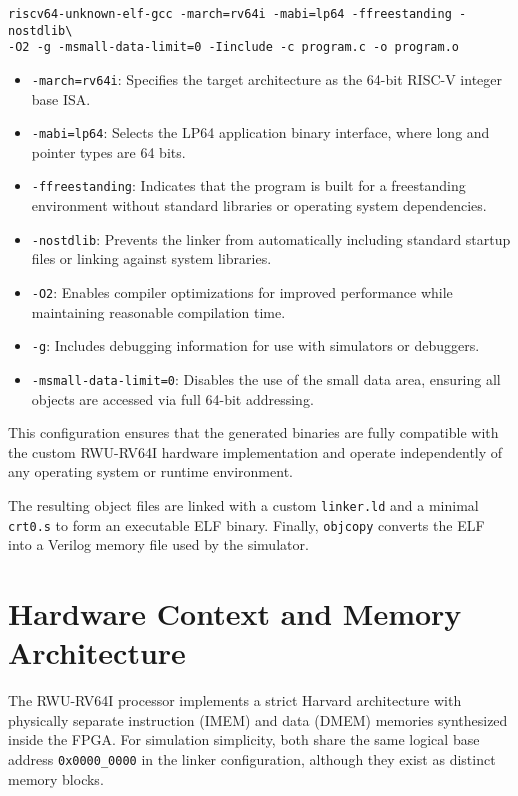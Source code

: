 \begin{verbatim}
riscv64-unknown-elf-gcc -march=rv64i -mabi=lp64 -ffreestanding -nostdlib\
-O2 -g -msmall-data-limit=0 -Iinclude -c program.c -o program.o
\end{verbatim}

\begin{itemize}
  \item \texttt{-march=rv64i}: Specifies the target architecture as the 64-bit RISC-V integer base ISA.  
  \item \texttt{-mabi=lp64}: Selects the LP64 application binary interface, where long and pointer types are 64 bits.  
  \item \texttt{-ffreestanding}: Indicates that the program is built for a freestanding environment without standard libraries or operating system dependencies.  
  \item \texttt{-nostdlib}: Prevents the linker from automatically including standard startup files or linking against system libraries.  
  \item \texttt{-O2}: Enables compiler optimizations for improved performance while maintaining reasonable compilation time.  
  \item \texttt{-g}: Includes debugging information for use with simulators or debuggers.  
  \item \texttt{-msmall-data-limit=0}: Disables the use of the small data area, ensuring all objects are accessed via full 64-bit addressing.  
\end{itemize}

This configuration ensures that the generated binaries are fully compatible with the custom RWU-RV64I hardware implementation and operate independently of any operating system or runtime environment.


The resulting object files are linked with a custom \texttt{linker.ld} and a minimal \texttt{crt0.s} to form an executable ELF binary.  
Finally, \texttt{objcopy} converts the ELF into a Verilog memory file used by the simulator.

\section{Hardware Context and Memory Architecture}
The RWU-RV64I processor implements a strict Harvard architecture with physically separate instruction (IMEM) and data (DMEM) memories synthesized inside the FPGA.  
For simulation simplicity, both share the same logical base address \texttt{0x0000\_0000} in the linker configuration, although they exist as distinct memory blocks.

